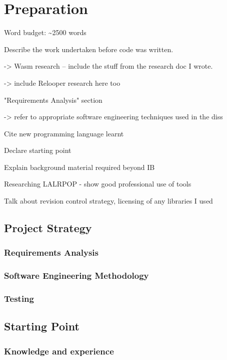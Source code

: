 \documentclass[00-main.tex]{subfiles}
\begin{document}
\chapter{Preparation}

\begin{Comment}
Word budget: \textasciitilde 2500 words
\end{Comment}

\begin{Comment}
Describe the work undertaken before code was written.

-> Wasm research -- include the stuff from the research doc I wrote.

-> include Relooper research here too

"Requirements Analysis" section

-> refer to appropriate software engineering techniques used in the diss

Cite new programming language learnt

Declare starting point

Explain background material required beyond IB

Researching LALRPOP - show good professional use of tools

Talk about revision control strategy, licensing of any libraries I used
\end{Comment}

\section{Project Strategy}

\subsection{Requirements Analysis}

\subsection{Software Engineering Methodology}

\subsection{Testing}

\section{Starting Point}

\subsection{Knowledge and experience}
\end{document}
